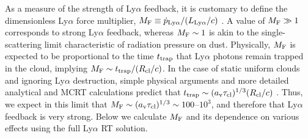 \documentclass[fleqn,usenatbib]{mnras}
\newcommand{\taucl}{\tau_{\rm cl}}
\begin{document}
As a measure of the strength of Ly$\alpha$ feedback, it is customary to define the dimensionless Ly$\alpha$ force multiplier, $M_{\rm F} \equiv \Dot{p}_{\rm Ly\alpha}/(L_{\rm Ly\alpha}/c)$ \citep[e.g.][]{Dijkstra2008, Kimm2018, Smith2019, Tomaselli2021}. A value of $M_{\rm F} \gg 1$ corresponds to strong Ly$\alpha$ feedback, whereas $M_{\rm F} \sim 1$ is akin to the single-scattering limit characteristic of radiation pressure on dust. Physically, $M_{\rm F}$ is expected to be proportional to the time $t_{\rm trap}$ that Ly$\alpha$ photons remain trapped in the cloud, implying $M_{\rm F} \sim t_{\rm trap}/(R_{\rm cl}/c)$. In the case of static uniform clouds and ignoring Ly$\alpha$ destruction, simple physical arguments and more detailed analytical and MCRT calculations predict that $t_{\rm trap} \sim (a_{\rm v} \taucl)^{1/3} (R_{\rm cl}/c)$ \citep[e.g.][]{Adams1975, Bonilha1979, Spaans2006, Smith2018_discretediffusion, Lao2020}. Thus, we expect in this limit that $M_{\rm F} \sim (a_{\rm v} \taucl)^{1/3} \sim 100$--$10^3$, and therefore that Ly$\alpha$ feedback is very strong. Below we calculate $M_{\rm F}$ and its dependence on various effects using the full Ly$\alpha$ RT solution.  
\end{document}
